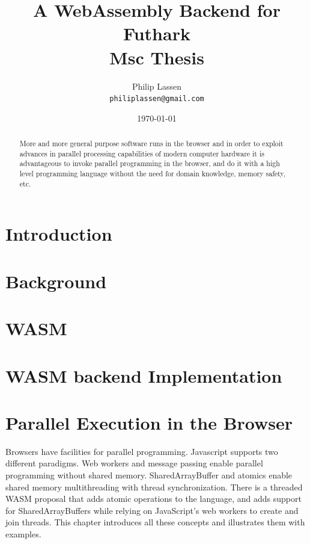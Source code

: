 \documentclass[11pt]{article}
\title{
  \vspace{3cm}
  \Huge{A WebAssembly Backend for Futhark} \\
  \Large{Msc Thesis}
}
\author{
  \Large{Philip Lassen}
  \\ \texttt{philiplassen@gmail.com} \\
}
\date{
    \today
}
\def \ColourPDF {include/natbio-farve}
\def \TitlePDF   {include/nat-en}  %
\begin{document}


\clearpage\maketitle
\thispagestyle{empty}

\newpage


\begin{abstract}
More and more general purpose software runs in the browser and in order to exploit advances in parallel processing capabilities of modern computer hardware it is advantageous to invoke parallel programming in the browser, and do it with a high level programming language without the need for domain knowledge, memory safety, etc.
\end{abstract}


\newpage
\tableofcontents
\newpage

\section{Introduction}
\section{Background}
\section{WASM}
\section{WASM backend Implementation}





\section{Parallel Execution in the Browser}

Browsers have facilities for parallel programming. Javascript supports two different paradigms. Web workers and message passing enable parallel programming without shared memory. SharedArrayBuffer and atomics enable shared memory multithreading with thread synchronization. There is a threaded WASM proposal that adds atomic operations to the language, and adds support for SharedArrayBuffers while relying on JavaScript's web workers to create and join threads. This chapter introduces all these concepts and illustrates them with examples.
\end{document}

